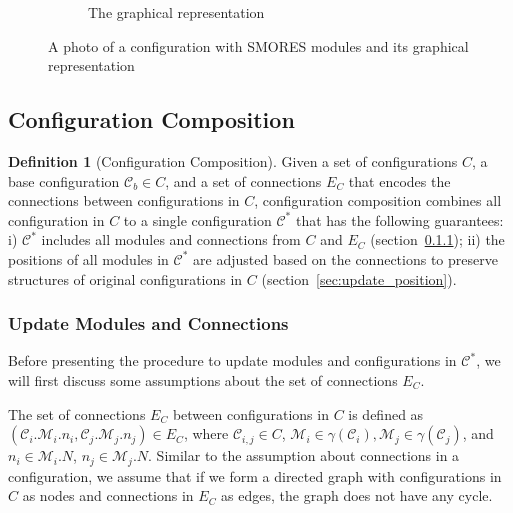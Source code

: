 \documentclass[conference]{IEEEtran}
\theoremstyle{definition}
\newtheorem{definition}{Definition}[section]
\begin{document}
\begin{figure}
\begin{center}
\begin{subfigure}[b]{0.4\columnwidth}
                \caption{The graphical representation}
                \label{fig:smores_conf_graph}
        \end{subfigure}
\end{center}
\caption{A photo of a configuration with SMORES modules and its graphical representation}
\label{fig:smores_conf}
\end{figure}


\subsection{Configuration Composition} \label{sec:conf_composition}


\begin{definition}[Configuration Composition]
Given a set of configurations $C$, a base configuration $\mathcal{C}_b\in C$, and a set of connections $E_C$ that encodes the connections between configurations in $C$, configuration composition combines all configuration in $C$ to a single configuration $\mathcal{C}^*$ that has the following guarantees: i) $\mathcal{C}^*$ includes all modules and connections from $C$ and $E_C$ (section~\ref{sec:update_connection}); ii) the positions of all modules in $\mathcal{C}^*$ are adjusted based on the connections to preserve structures of original configurations in $C$ (section~\ref{sec:update_position}).
\end{definition}

\subsubsection{Update Modules and Connections} \label{sec:update_connection}
Before presenting the procedure to update modules and configurations in $\mathcal{C}^*$, we will first discuss some assumptions about the set of connections $E_C$.

The set of connections $E_C$ between configurations in $C$ is defined as $(\mathcal{C}_i.\mathcal{M}_i.n_i, \mathcal{C}_j.\mathcal{M}_j.n_j) \in E_C$, where $\mathcal{C}_{i,j}\in C$, $\mathcal{M}_i \in \gamma(\mathcal{C}_i), \mathcal{M}_j \in \gamma(\mathcal{C}_j)$, and $n_i\in \mathcal{M}_i.N$, $n_j\in \mathcal{M}_j.N$. Similar to the assumption about connections in a configuration, we assume that if we form a directed graph with configurations in $C$ as nodes and connections in $E_C$ as edges, the graph does not have any cycle.
\end{document}

